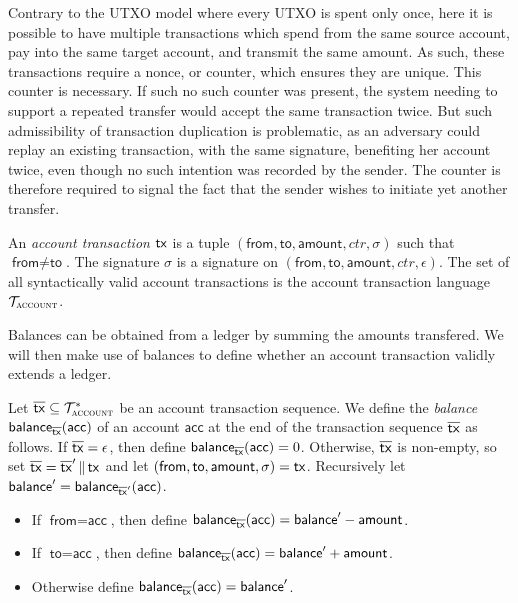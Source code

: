 Contrary to the UTXO model where every UTXO is spent only once, here it is
possible to have multiple transactions which spend from the same source account,
pay into the same target account, and transmit the same amount. As such, these
transactions require a nonce, or counter, which ensures they are unique. This
counter is necessary. If such no such counter was present, the system needing to
support a repeated transfer would accept the same transaction twice. But such
admissibility of transaction duplication is problematic, as an adversary could
replay an existing transaction, with the same signature, benefiting her account
twice, even though no such intention was recorded by the sender. The counter is
therefore required to signal the fact that the sender wishes to initiate yet
another transfer.

\begin{definition}
  An \emph{account transaction} $\mathsf{tx}$ is a tuple
  $(\textsf{from},\allowbreak
   \textsf{to},\allowbreak
   \textsf{amount},\allowbreak
   ctr,\allowbreak
   \sigma)$ such that $\textsf{from} \neq \textsf{to}$.
  The signature $\sigma$ is a signature on
  $(\textsf{from},\allowbreak
    \textsf{to},\allowbreak
    \textsf{amount},\allowbreak
    ctr,\allowbreak
    \epsilon)$. The set of all
  syntactically valid account transactions is the account transaction language
  $\mathcal{T}_\textsc{account}$.
\end{definition}

Balances can be obtained from a ledger by summing the amounts transfered. We
will then make use of balances to define whether an account transaction validly
extends a ledger.

\begin{definition}
  Let $\overline{\mathsf{tx}} \subseteq \mathcal{T}_\textsc{account}^*$ be an account
  transaction sequence. We define the \emph{balance}
  $\textsf{balance}_{\overline{\mathsf{tx}}}(\textsf{acc})$
  of an account $\textsf{acc}$
  at the end of the transaction sequence $\overline{\mathsf{tx}}$
  as follows. If $\overline{\mathsf{tx}} = \epsilon$, then define
  $\textsf{balance}_{\overline{\mathsf{tx}}}(\textsf{acc}) = 0$.
  Otherwise, $\overline{\mathsf{tx}}$ is non-empty, so set
  $\overline{\mathsf{tx}} = \overline{\mathsf{tx}}'\,\|\,\mathsf{tx}$
  and let $(\textsf{from}, \textsf{to}, \textsf{amount}, \sigma) = \mathsf{tx}$.
  Recursively let
  $\textsf{balance}' = \textsf{balance}_{\overline{\mathsf{tx}}'}(\textsf{acc})$.
  \begin{itemize}
    \item If $\textsf{from} = \textsf{acc}$, then define
          $\textsf{balance}_{\overline{\mathsf{tx}}}(\textsf{acc}) = \textsf{balance}' - \textsf{amount}$.
    \item If $\textsf{to} = \textsf{acc}$, then define
          $\textsf{balance}_{\overline{\mathsf{tx}}}(\textsf{acc}) = \textsf{balance}' + \textsf{amount}$.
    \item Otherwise
          define $\textsf{balance}_{\overline{\mathsf{tx}}}(\textsf{acc}) = \textsf{balance}'$.
\end{itemize}
\end{definition}

